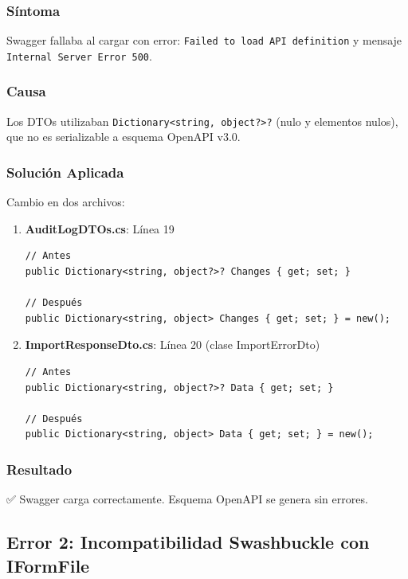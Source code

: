 \documentclass[12pt,a4paper]{article}
\begin{document}
\subsubsection{Síntoma}

Swagger fallaba al cargar con error: \texttt{Failed to load API definition} y mensaje \texttt{Internal Server Error 500}.

\subsubsection{Causa}

Los DTOs utilizaban \texttt{Dictionary<string, object?>?} (nulo y elementos nulos), que no es serializable a esquema OpenAPI v3.0.

\subsubsection{Solución Aplicada}

Cambio en dos archivos:

\begin{enumerate}
    \item \textbf{AuditLogDTOs.cs}: Línea 19
    \begin{lstlisting}
// Antes
public Dictionary<string, object?>? Changes { get; set; }

// Después
public Dictionary<string, object> Changes { get; set; } = new();
    \end{lstlisting}

    \item \textbf{ImportResponseDto.cs}: Línea 20 (clase ImportErrorDto)
    \begin{lstlisting}
// Antes
public Dictionary<string, object?>? Data { get; set; }

// Después
public Dictionary<string, object> Data { get; set; } = new();
    \end{lstlisting}
\end{enumerate}

\subsubsection{Resultado}

✅ Swagger carga correctamente. Esquema OpenAPI se genera sin errores.

\subsection{Error 2: Incompatibilidad Swashbuckle con IFormFile}
\end{document}
